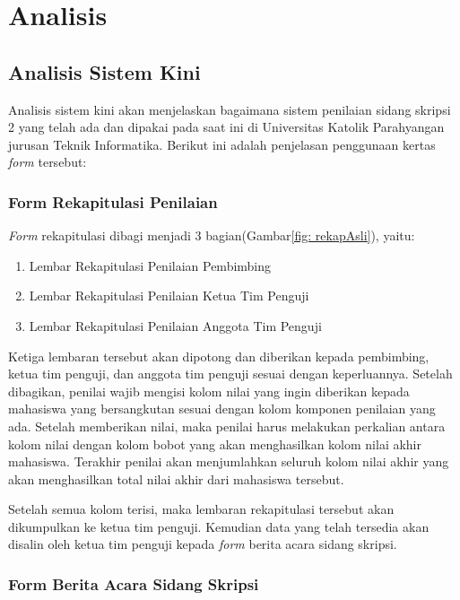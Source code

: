 \chapter{Analisis}
\label{chap: analisis}

\section{Analisis Sistem Kini}
\label{sec: analisiSKini}

Analisis sistem kini akan menjelaskan bagaimana sistem penilaian sidang skripsi 2 yang telah ada dan dipakai pada saat ini di Universitas Katolik Parahyangan jurusan Teknik Informatika. Berikut ini adalah penjelasan penggunaan kertas \textit{form} tersebut:

	\subsection{Form Rekapitulasi Penilaian}
	\label{sub: rekapPenil}
	
	\textit{Form} rekapitulasi dibagi menjadi 3 bagian(Gambar\ref{fig: rekapAsli}), yaitu:
		\begin{enumerate}
			\item Lembar Rekapitulasi Penilaian Pembimbing
			\item Lembar Rekapitulasi Penilaian Ketua Tim Penguji
			\item Lembar Rekapitulasi Penilaian Anggota Tim Penguji
		\end{enumerate}
	
	Ketiga lembaran tersebut akan dipotong dan diberikan kepada pembimbing, ketua tim penguji, dan anggota tim penguji sesuai dengan keperluannya. Setelah dibagikan, penilai wajib mengisi kolom nilai yang ingin diberikan kepada mahasiswa yang bersangkutan sesuai dengan kolom komponen penilaian yang ada. Setelah memberikan nilai, maka penilai harus melakukan perkalian antara kolom nilai dengan kolom bobot yang akan menghasilkan kolom nilai akhir mahasiswa. Terakhir penilai akan menjumlahkan seluruh kolom nilai akhir yang akan menghasilkan total nilai akhir dari mahasiswa tersebut.
	
	Setelah semua kolom terisi, maka lembaran rekapitulasi tersebut akan dikumpulkan ke ketua tim penguji. Kemudian data yang telah tersedia akan disalin oleh ketua tim penguji kepada \textit{form} berita acara sidang skripsi.
	
	\subsection{Form Berita Acara Sidang Skripsi}
	\label{sub: formSkripsi}
	
